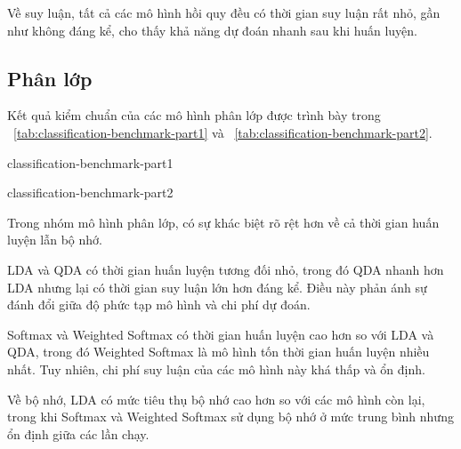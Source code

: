 Về suy luận, tất cả các mô hình hồi quy đều có thời gian suy luận rất nhỏ, gần
như không đáng kể, cho thấy khả năng dự đoán nhanh sau khi huấn luyện.

\subsection{Phân lớp}

Kết quả kiểm chuẩn của các mô hình phân lớp được trình bày trong
\tablename~\ref{tab:classification-benchmark-part1} và
\tablename~\ref{tab:classification-benchmark-part2}.

\begin{table}[htbp]
  \centering
  \caption{Kết quả kiểm chuẩn các mô hình phân lớp (phần 1)}
  \label{tab:classification-benchmark-part1}
  {classification-benchmark-part1}
\end{table}

\begin{table}[htbp]
  \centering
  \caption{Kết quả kiểm chuẩn các mô hình phân lớp (phần 2)}
  \label{tab:classification-benchmark-part2}
  {classification-benchmark-part2}
\end{table}

Trong nhóm mô hình phân lớp, có sự khác biệt rõ rệt hơn về cả thời gian huấn
luyện lẫn bộ nhớ.

LDA và QDA có thời gian huấn luyện tương đối nhỏ, trong đó QDA nhanh hơn LDA
nhưng lại có thời gian suy luận lớn hơn đáng kể. Điều này phản ánh sự đánh đổi
giữa độ phức tạp mô hình và chi phí dự đoán.

Softmax và Weighted Softmax có thời gian huấn luyện cao hơn so với LDA và QDA,
trong đó Weighted Softmax là mô hình tốn thời gian huấn luyện nhiều nhất. Tuy
nhiên, chi phí suy luận của các mô hình này khá thấp và ổn định.

Về bộ nhớ, LDA có mức tiêu thụ bộ nhớ cao hơn so với các mô hình còn lại, trong
khi Softmax và Weighted Softmax sử dụng bộ nhớ ở mức trung bình nhưng ổn định
giữa các lần chạy.
